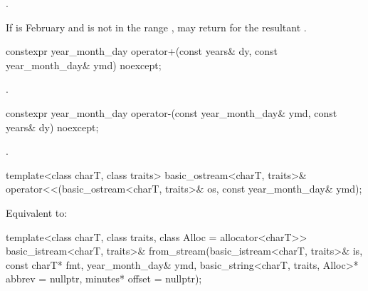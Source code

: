 \begin{itemdescr}
\pnum
\returns
{}.

\pnum
\begin{note}
If  is February
and  is not in the range ,
 may return  for
the resultant .
\end{note}
\end{itemdescr}

%
\begin{itemdecl}
constexpr year_month_day operator+(const years& dy, const year_month_day& ymd) noexcept;
\end{itemdecl}

\begin{itemdescr}
\pnum
\returns
{}.
\end{itemdescr}

%
\begin{itemdecl}
constexpr year_month_day operator-(const year_month_day& ymd, const years& dy) noexcept;
\end{itemdecl}

\begin{itemdescr}
\pnum
\returns
{}.
\end{itemdescr}

%
\begin{itemdecl}
template<class charT, class traits>
  basic_ostream<charT, traits>&
    operator<<(basic_ostream<charT, traits>& os, const year_month_day& ymd);
\end{itemdecl}

\begin{itemdescr}
\pnum
\effects
Equivalent to:
\end{itemdescr}

%
\begin{itemdecl}
template<class charT, class traits, class Alloc = allocator<charT>>
  basic_istream<charT, traits>&
    from_stream(basic_istream<charT, traits>& is, const charT* fmt,
                year_month_day& ymd, basic_string<charT, traits, Alloc>* abbrev = nullptr,
                minutes* offset = nullptr);
\end{itemdecl}

